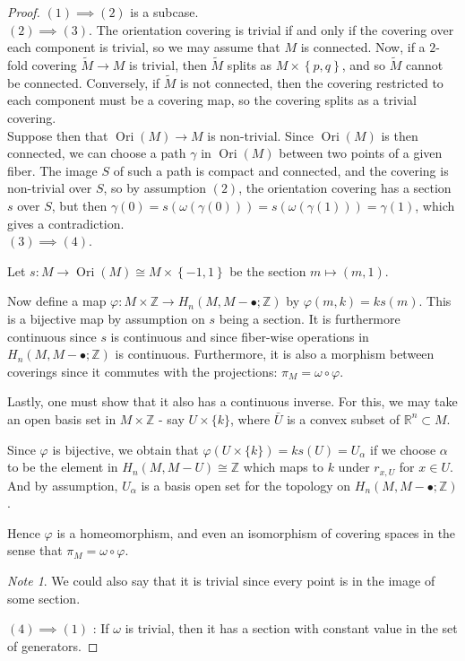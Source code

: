 \documentclass[reqno]{amsart}
\theoremstyle{definition}
\theoremstyle{remark}
\newtheorem*{note}{Note}
\DeclareMathOperator{\Ori}{Ori}
\begin{document}
\begin{proof}
    $(1) \implies (2)$ is a subcase.\\
    $(2) \implies (3)$. The orientation covering is
    trivial if and only if the covering over
    each component is trivial, so we may
    assume that $M$ is connected. 
    Now, if a $2$-fold covering
    $ \tilde{M} \to M$ is trivial, then $\tilde{M}$ splits
    as $M \times \left\{ p,q \right\} $, and
    so $\tilde{M}$ cannot be connected.
    Conversely, if $\tilde{M}$ is not connected, then
    the covering restricted to each component must be
    a covering map, so the covering splits as a
    trivial covering.\\
    Suppose then that
    $\Ori(M) \to M$ is non-trivial. Since
    $\Ori(M)$ is then connected, we can choose
    a path $\gamma$ 
    in $\Ori(M)$ between two points of a given
    fiber. The image $S$ of such a path is compact and connected,
    and the covering is non-trivial over $S$, so
    by assumption $(2)$, the orientation covering has
    a section $s$ over $S$, but then
    $\gamma(0) = 
    s \left( \omega (\gamma(0)) \right) = 
    s \left( \omega \left( \gamma(1) \right)  \right) 
    = \gamma(1)$, which gives a contradiction.\\
    $(3) \implies (4)$. 

    Let $s \colon
    M \to \Ori (M) \cong M \times \left\{ -1,1 \right\} $ be
    the section $m \mapsto (m,1)$.

Now define a map $\varphi \colon M \times \mathbb{Z} \to 
H_n(M, M-\bullet; \mathbb{Z})$ by
$\varphi (m,k) = ks(m)$. This is a bijective map by assumption on $s$ being a section. 
It is furthermore continuous since $s$ is continuous and
since fiber-wise operations in $H_n(M,M-\bullet; \mathbb{Z})$
is continuous.
Furthermore, it is also a morphism between coverings since it commutes with the
projections: $\pi_M = \omega \circ \varphi$.

Lastly, one must show that it also has a continuous inverse. For this, we may take an open basis set in $M \times \mathbb{Z}$ - say $U\times \{k\}$, where $\bar{U}$ is a convex subset of $\mathbb{R}^n \subset M$.

Since $\varphi$ is bijective, we obtain that $\varphi(U \times \{k\}) = k s(U)
= U_\alpha$ if we choose $\alpha$ to be the element in $H_n(M, M-U) \cong \mathbb{Z}$
which maps to $k$ under $r_{x,U}$ for $x \in U$.
And by assumption, $U_\alpha$ is a basis open set for
the topology on $H_n(M, M - \bullet ; \mathbb{Z})$.

Hence $\varphi$ is a homeomorphism, and even an isomorphism of covering spaces
in the sense that $\pi_M = \omega \circ \varphi$.

\begin{note}
    We could also say that it is trivial since
    every point is in the image of some section.
\end{note}

$(4) \implies (1)$ : If $\omega$ is trivial, then
it has a section with constant value in the set
of generators.

\end{proof}
\end{document}

